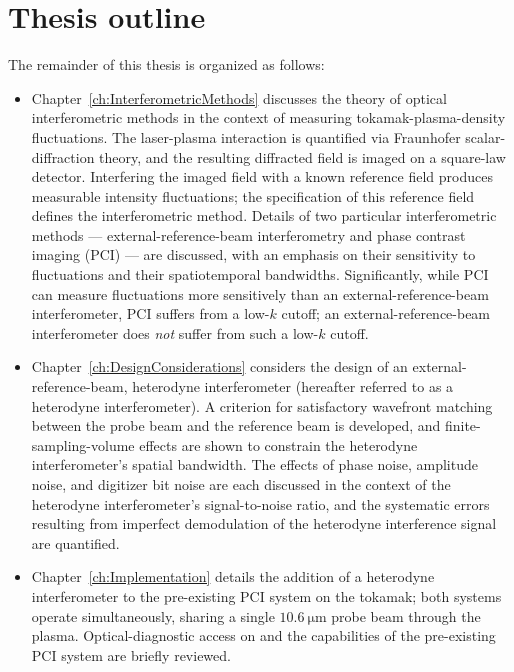 \section{Thesis outline}
The remainder of this thesis is organized as follows:

\begin{itemize}
  \item Chapter~\ref{ch:InterferometricMethods} discusses
    the theory of optical interferometric methods
    in the context of measuring tokamak-plasma-density fluctuations.
    The laser-plasma interaction is quantified via
    Fraunhofer scalar-diffraction theory, and
    the resulting diffracted field is imaged on a square-law detector.
    Interfering the imaged field with a known reference field
    produces measurable intensity fluctuations;
    the specification of this reference field
    defines the interferometric method.
    Details of two particular interferometric methods ---
    external-reference-beam interferometry and
    phase contrast imaging (PCI) ---
    are discussed, with an emphasis on
    their sensitivity to fluctuations and their spatiotemporal bandwidths.
    Significantly, while PCI can measure fluctuations more sensitively
    than an external-reference-beam interferometer,
    PCI suffers from a low-$k$ cutoff;
    an external-reference-beam interferometer
    does \emph{not} suffer from such a low-$k$ cutoff.
  \item Chapter~\ref{ch:DesignConsiderations} considers the design of an
    external-reference-beam, heterodyne interferometer
    (hereafter referred to as a heterodyne interferometer).
    A criterion for satisfactory wavefront matching
    between the probe beam and the reference beam is developed, and
    finite-sampling-volume effects are shown
    to constrain the heterodyne interferometer's spatial bandwidth.
    The effects of phase noise, amplitude noise, and digitizer bit noise
    are each discussed in the context of
    the heterodyne interferometer's signal-to-noise ratio, and
    the systematic errors resulting from
    imperfect demodulation of the heterodyne interference signal
    are quantified.
  \item Chapter~\ref{ch:Implementation} details
    the addition of a heterodyne interferometer
    to the pre-existing PCI system on the \diiid\space tokamak;
    both systems operate simultaneously,
    sharing a single $\SI{10.6}{\micro\meter}$ probe beam through the plasma.
    Optical-diagnostic access on \diiid\space and the capabilities
    of the pre-existing PCI system are briefly reviewed.

\end{itemize}
